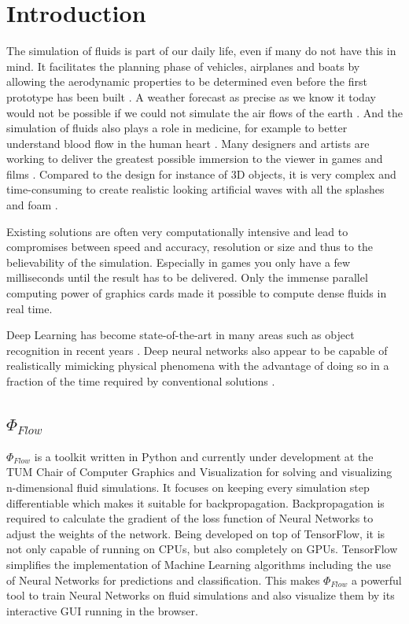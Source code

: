 \chapter{Introduction}\label{chapter:introduction}
The simulation of fluids is part of our daily life, even if many do not have this in mind. It facilitates the planning phase of vehicles, airplanes and boats by allowing the aerodynamic properties to be determined even before the first prototype has been built \parencite{tsubokura2009computational}. A weather forecast as precise as we know it today would not be possible if we could not simulate the air flows of the earth \parencite{kimura2002numerical}. And the simulation of fluids also plays a role in medicine, for example to better understand blood flow in the human heart \parencite{peskin1977numerical}. Many designers and artists are working to deliver the greatest possible immersion to the viewer in games and films \parencite{gilland2009elemental}. Compared to the design for instance of 3D objects, it is very complex and time-consuming to create realistic looking artificial waves with all the splashes and foam \parencite{gilland2009elemental}.
\par Existing solutions are often very computationally intensive and lead to compromises between speed and accuracy, resolution or size and thus to the believability of the simulation. Especially in games you only have a few milliseconds until the result has to be delivered. Only the immense parallel computing power of graphics cards made it possible to compute dense fluids in real time. 
\par Deep Learning has become state-of-the-art in many areas such as object recognition in recent years \parencite{lecun2015deep}. Deep neural networks also appear to be capable of realistically mimicking physical phenomena with the advantage of doing so in a fraction of the time required by conventional solutions \parencite{tompson2017accelerating} \parencite{thuerey2018well}.
\section{$\Phi_\textit{Flow}$ }
$\Phi_\textit{Flow}$ is a toolkit written in Python and currently under development at the TUM Chair of Computer Graphics and Visualization for solving and visualizing n-dimensional fluid simulations. It focuses on keeping every simulation step differentiable which makes it suitable for backpropagation. Backpropagation is required to calculate the gradient of the loss function of Neural Networks to adjust the weights of the network. Being developed on top of TensorFlow, it is not only capable of running on CPUs, but also completely on GPUs. TensorFlow simplifies the implementation of Machine Learning algorithms including the use of Neural Networks for predictions and classification. This makes $\Phi_\textit{Flow}$ a powerful tool to train Neural Networks on fluid simulations and also visualize them by its interactive GUI running in the browser. 
